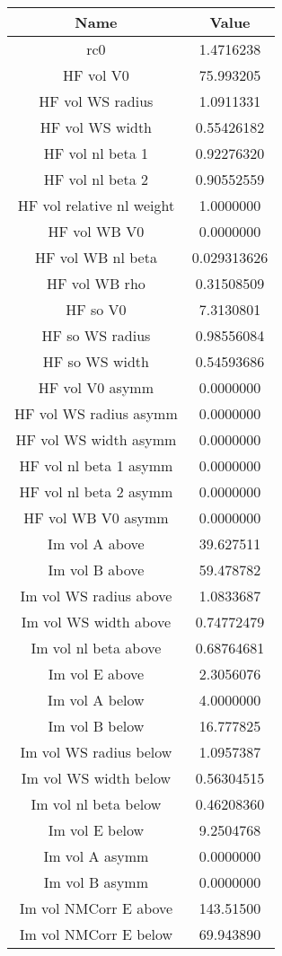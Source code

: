 \begin{tabular}{|c||c|} 
 \hline 
\bf{Name} & \bf{Value} \\
 \hline
 \hline 
rc0 & 1.4716238\\
HF vol V0 & 75.993205\\
HF vol WS radius & 1.0911331\\
HF vol WS width & 0.55426182\\
HF vol nl beta 1 & 0.92276320\\
HF vol nl beta 2 & 0.90552559\\
HF vol relative nl weight & 1.0000000\\
HF vol WB V0 & 0.0000000\\
HF vol WB nl beta & 0.029313626\\
HF vol WB rho & 0.31508509\\
HF so V0 & 7.3130801\\
HF so WS radius & 0.98556084\\
HF so WS width & 0.54593686\\
HF vol V0 asymm & 0.0000000\\
HF vol WS radius asymm & 0.0000000\\
HF vol WS width asymm & 0.0000000\\
HF vol nl beta 1 asymm & 0.0000000\\
HF vol nl beta 2 asymm & 0.0000000\\
HF vol WB V0 asymm & 0.0000000\\
Im vol A above & 39.627511\\
Im vol B above & 59.478782\\
Im vol WS radius above & 1.0833687\\
Im vol WS width above & 0.74772479\\
Im vol nl beta above & 0.68764681\\
Im vol E above & 2.3056076\\
Im vol A below & 4.0000000\\
Im vol B below & 16.777825\\
Im vol WS radius below & 1.0957387\\
Im vol WS width below & 0.56304515\\
Im vol nl beta below & 0.46208360\\
Im vol E below & 9.2504768\\
Im vol A asymm & 0.0000000\\
Im vol B asymm & 0.0000000\\
Im vol NMCorr E above & 143.51500\\
Im vol NMCorr E below & 69.943890\\

\end{tabular}
